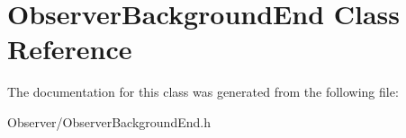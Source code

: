 \hypertarget{classObserverBackgroundEnd}{}\section{Observer\+Background\+End Class Reference}
\label{classObserverBackgroundEnd}


The documentation for this class was generated from the following file\+:\begin{DoxyCompactItemize}
\item 
Observer/Observer\+Background\+End.\+h\end{DoxyCompactItemize}
